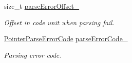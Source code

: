 \begin{DoxyCompactItemize}
size\+\_\+t \mbox{\hyperlink{classrapidjson_1_1_generic_pointer_a28e0ba01bc383d2fe7d54a450e35cd7a}{parse\+Error\+Offset\+\_\+}}
\begin{DoxyCompactList}\small\item\em Offset in code unit when parsing fail. \end{DoxyCompactList}\item 
\mbox{\hyperlink{group___r_a_p_i_d_j_s_o_n___e_r_r_o_r_s_gade540ee4cc2a416c23b8ee2c12393c7b}{Pointer\+Parse\+Error\+Code}} \mbox{\hyperlink{classrapidjson_1_1_generic_pointer_a20d76ef128abbdd0acd87d2f1fb0ae34}{parse\+Error\+Code\+\_\+}}
\begin{DoxyCompactList}\small\item\em Parsing error code. \end{DoxyCompactList}\end{DoxyCompactItemize}
